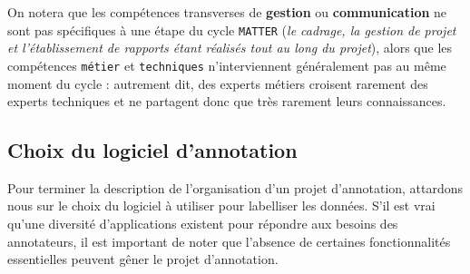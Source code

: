 		On notera que les compétences transverses de \textbf{gestion} ou \textbf{communication} ne sont pas spécifiques à une étape du cycle \texttt{MATTER} (\textit{le cadrage, la gestion de projet et l'établissement de rapports étant réalisés tout au long du projet}), alors que les compétences \texttt{métier} et \texttt{techniques} n'interviennent généralement pas au même moment du cycle : autrement dit, des experts métiers croisent rarement des experts techniques et ne partagent donc que très rarement leurs connaissances.
	
	
	\subsection{Choix du logiciel d'annotation}
	\label{section:2.2.3-ORGANISATION-ANNOTATION-LOGICIELS}
	
		Pour terminer la description de l'organisation d'un projet d'annotation, attardons nous sur le choix du logiciel à utiliser pour labelliser les données.
		S'il est vrai qu'une diversité d'applications existent pour répondre aux besoins des annotateurs, il est important de noter que l'absence de certaines fonctionnalités essentielles peuvent gêner le projet d'annotation.
		
